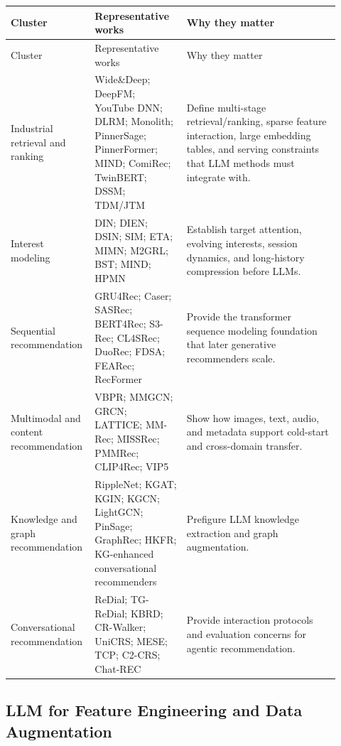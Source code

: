 \documentclass[11pt]{article}
\begin{document}
\small
\begin{longtable}{@{}p{0.20\linewidth}p{0.27\linewidth}p{0.45\linewidth}@{}}
\toprule
Cluster & Representative works & Why they matter\\
\midrule
\endfirsthead
\toprule
Cluster & Representative works & Why they matter\\
\midrule
\endhead
Industrial retrieval and ranking & Wide\&Deep; DeepFM; YouTube DNN; DLRM; Monolith; PinnerSage; PinnerFormer; MIND; ComiRec; TwinBERT; DSSM; TDM/JTM & Define multi-stage retrieval/ranking, sparse feature interaction, large embedding tables, and serving constraints that LLM methods must integrate with.\\
Interest modeling & DIN; DIEN; DSIN; SIM; ETA; MIMN; M2GRL; BST; MIND; HPMN & Establish target attention, evolving interests, session dynamics, and long-history compression before LLMs.\\
Sequential recommendation & GRU4Rec; Caser; SASRec; BERT4Rec; S3-Rec; CL4SRec; DuoRec; FDSA; FEARec; RecFormer & Provide the transformer sequence modeling foundation that later generative recommenders scale.\\
Multimodal and content recommendation & VBPR; MMGCN; GRCN; LATTICE; MM-Rec; MISSRec; PMMRec; CLIP4Rec; VIP5 & Show how images, text, audio, and metadata support cold-start and cross-domain transfer.\\
Knowledge and graph recommendation & RippleNet; KGAT; KGIN; KGCN; LightGCN; PinSage; GraphRec; HKFR; KG-enhanced conversational recommenders & Prefigure LLM knowledge extraction and graph augmentation.\\
Conversational recommendation & ReDial; TG-ReDial; KBRD; CR-Walker; UniCRS; MESE; TCP; C2-CRS; Chat-REC & Provide interaction protocols and evaluation concerns for agentic recommendation.\\
\bottomrule
\end{longtable}
\normalsize

\subsection{LLM for Feature Engineering and Data Augmentation}
\end{document}
